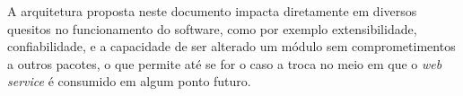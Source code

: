 A arquitetura proposta neste documento impacta diretamente em diversos quesitos no funcionamento do software, como por exemplo extensibilidade, confiabilidade, e a capacidade de ser alterado um módulo sem comprometimentos a outros pacotes, o que permite até se for o caso a troca no meio em que o \textit{web service} é consumido em algum ponto futuro.